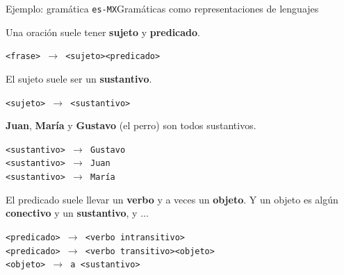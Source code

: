 \documentclass[spanish, handout]{beamer}
\begin{document}
\begin{frame}{Ejemplo: gramática \texttt{es-MX}}{Gramáticas como representaciones de lenguajes}

    Una \alert{oración} suele tener \textbf{sujeto} y \textbf{predicado}. \pause

    {\large \texttt{<frase> $\to$ <sujeto><predicado>}} \pause

    \bigskip

    El \alert{sujeto} suele ser un \textbf{sustantivo}. \pause

    {\large \texttt{<sujeto> $\to$ <sustantivo>}} \pause

    \bigskip

    \textbf{Juan}, \textbf{María} y \textbf{Gustavo} (el perro) son todos \alert{sustantivos}. \pause

    {\large \texttt{<sustantivo> $\to$ Gustavo}}\\
    {\large \texttt{<sustantivo> $\to$ Juan}}\\
    {\large \texttt{<sustantivo> $\to$ María}} \pause

    \bigskip

    El \alert{predicado} suele llevar un \textbf{verbo} y a veces un \textbf{objeto}. Y un \alert{objeto} es algún \textbf{conectivo} y un \textbf{sustantivo}, y ... \pause

    {\large \texttt{<predicado> $\to$ <verbo intransitivo>}}\\
    {\large \texttt{<predicado> $\to$ <verbo transitivo><objeto>}}\\
    {\large \texttt{<objeto> $\to$ a <sustantivo>}}

\end{frame}
\end{document}
